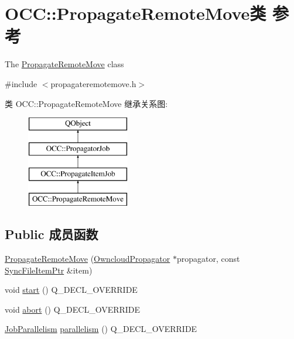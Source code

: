 \hypertarget{class_o_c_c_1_1_propagate_remote_move}{}\section{O\+CC\+:\+:Propagate\+Remote\+Move类 参考}
\label{class_o_c_c_1_1_propagate_remote_move}


The \hyperlink{class_o_c_c_1_1_propagate_remote_move}{Propagate\+Remote\+Move} class  




{\ttfamily \#include $<$propagateremotemove.\+h$>$}

类 O\+CC\+:\+:Propagate\+Remote\+Move 继承关系图\+:\begin{figure}[H]
\begin{center}
\leavevmode
\includegraphics[height=4.000000cm]{class_o_c_c_1_1_propagate_remote_move}
\end{center}
\end{figure}
\subsection*{Public 成员函数}
\begin{DoxyCompactItemize}
\item 
\hyperlink{class_o_c_c_1_1_propagate_remote_move_a3302166605b951bff7117b100a8baada}{Propagate\+Remote\+Move} (\hyperlink{class_o_c_c_1_1_owncloud_propagator}{Owncloud\+Propagator} $\ast$propagator, const \hyperlink{namespace_o_c_c_acb6b0db82893659fbd0c98d3c5b8e2b8}{Sync\+File\+Item\+Ptr} \&item)
\item 
void \hyperlink{class_o_c_c_1_1_propagate_remote_move_a2cd9e57f880e1e408c27fad40cdeaf70}{start} () Q\+\_\+\+D\+E\+C\+L\+\_\+\+O\+V\+E\+R\+R\+I\+DE
\item 
void \hyperlink{class_o_c_c_1_1_propagate_remote_move_a7d8b531ca627952d2c8b81cd8b14674d}{abort} () Q\+\_\+\+D\+E\+C\+L\+\_\+\+O\+V\+E\+R\+R\+I\+DE
\item 
\hyperlink{class_o_c_c_1_1_propagator_job_a2527eb0e2b598fc260a2d6449689c156}{Job\+Parallelism} \hyperlink{class_o_c_c_1_1_propagate_remote_move_a489024a48010a86810fa35431fd65d9c}{parallelism} () Q\+\_\+\+D\+E\+C\+L\+\_\+\+O\+V\+E\+R\+R\+I\+DE
\end{DoxyCompactItemize}
